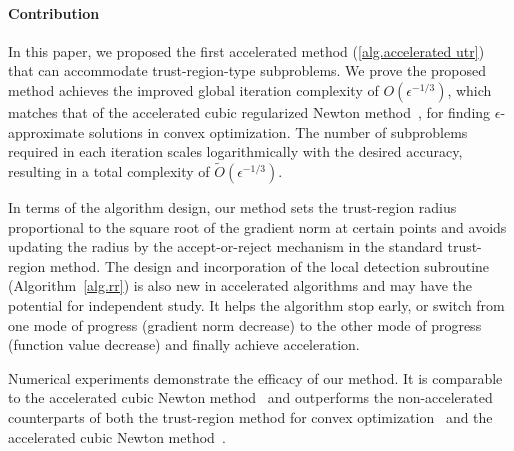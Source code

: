 \documentclass{article}
\begin{document}
\paragraph{Contribution}
In this paper, we proposed the first accelerated method (\cref{alg.accelerated utr}) that can accommodate trust-region-type subproblems. We prove the proposed method achieves the improved global iteration complexity of $O(\epsilon^{-1/3})$, which matches that of the accelerated cubic regularized Newton method~\cite{nesterov2008accelerating}, for finding $\epsilon$-approximate solutions in convex optimization. The number of subproblems required in each iteration scales logarithmically with the desired accuracy, resulting in a total complexity of $\tilde{O}(\epsilon^{-1/3})$.

In terms of the algorithm design, our method sets the trust-region radius proportional to the square root of the gradient norm at certain points and avoids updating the radius by the accept-or-reject mechanism in the standard trust-region method. The design and incorporation of the local detection subroutine (Algorithm~\ref{alg.rr}) is also new in accelerated algorithms and may have the potential for independent study. It helps the algorithm stop early, or switch from one mode of progress (gradient norm decrease) to the other mode of progress (function value decrease) and finally achieve acceleration.




Numerical experiments demonstrate the efficacy of our method. It is comparable to the accelerated cubic Newton method~\cite{nesterov2008accelerating} and outperforms the non-accelerated counterparts of both the trust-region method for convex optimization~\cite{jiang2024nonconvexityuniversaltrustregionmethod} and the accelerated cubic Newton method~\cite{nesterov2006cubic}.
\end{document}
